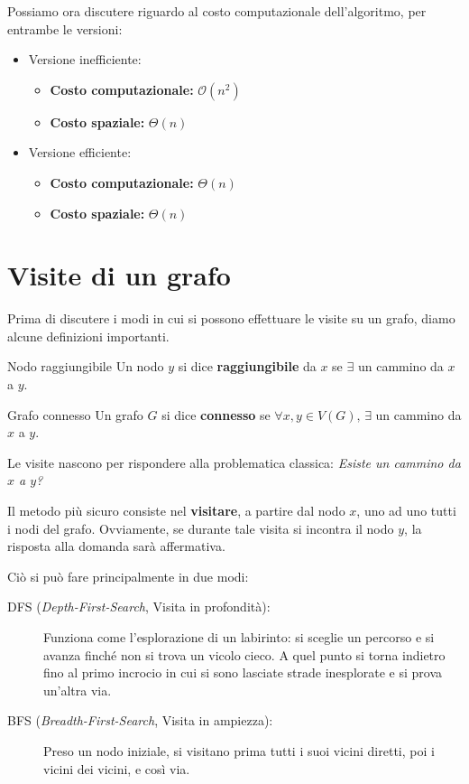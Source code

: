\documentclass[12pt]{report}
\begin{document}
	Possiamo ora discutere riguardo al costo computazionale dell'algoritmo, per entrambe le versioni:
	\begin{itemize}
		\item Versione inefficiente:
		\begin{itemize}
			\item \textbf{Costo computazionale:} $\mathcal{O}(n^2)$
			\item \textbf{Costo spaziale:} $\Theta(n)$
		\end{itemize}
		
		\item Versione efficiente:
		\begin{itemize}
			\item \textbf{Costo computazionale:} $\Theta(n)$
			\item \textbf{Costo spaziale:} $\Theta(n)$
		\end{itemize}
	\end{itemize}
	
	\section{Visite di un grafo}
	Prima di discutere i modi in cui si possono effettuare le visite su un grafo, diamo alcune definizioni importanti.
	
	\begin{definizione}{Nodo raggiungibile}{}
		Un nodo $y$ si dice \textbf{raggiungibile} da $x$ se $\exists$ un cammino da $x$ a $y$.
	\end{definizione}
	
	\begin{definizione}{Grafo connesso}{}
		Un grafo $G$ si dice \textbf{connesso} se $\forall x, y \in V(G),\, \exists$ un cammino da $x$ a $y$.
	\end{definizione}
	
	Le visite nascono per rispondere alla problematica classica: \textit{Esiste un cammino da $x$ a $y$?}
	
	Il metodo più sicuro consiste nel \textbf{visitare}, a partire dal nodo $x$, uno ad uno tutti i nodi del grafo. Ovviamente, se durante tale visita si incontra il nodo $y$, la risposta alla domanda sarà affermativa.
	
	Ciò si può fare principalmente in due modi:
	
	\begin{description}
		\item [DFS (\textit{Depth-First-Search}, Visita in profondità):] 
		Funziona come l'esplorazione di un labirinto: si sceglie un percorso e si avanza finché non si trova un vicolo cieco. A quel punto si torna indietro fino al primo incrocio in cui si sono lasciate strade inesplorate e si prova un'altra via.
		
		\item [BFS (\textit{Breadth-First-Search}, Visita in ampiezza):] 
		Preso un nodo iniziale, si visitano prima tutti i suoi vicini diretti, poi i vicini dei vicini, e così via.
	\end{description}
	
\end{document}
